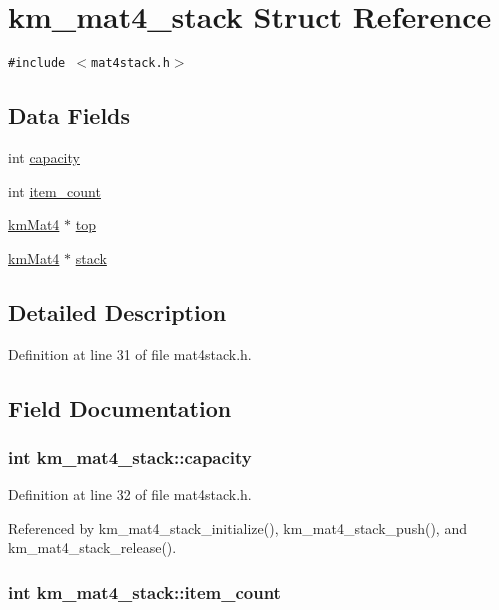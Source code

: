 \hypertarget{structkm__mat4__stack}{
\section{km\_\-mat4\_\-stack Struct Reference}
\label{structkm__mat4__stack}
}
{\tt \#include $<$mat4stack.h$>$}

\subsection*{Data Fields}
\begin{CompactItemize}
\item 
int \hyperlink{structkm__mat4__stack_069785a0a19481b635a91076f78547c7}{capacity}
\item 
int \hyperlink{structkm__mat4__stack_a29b07b2cae7bb1a8fbb699ec0ee3383}{item\_\-count}
\item 
\hyperlink{structkm_mat4}{kmMat4} $\ast$ \hyperlink{structkm__mat4__stack_487ba8aa0a0176eb21899bd8bc38f153}{top}
\item 
\hyperlink{structkm_mat4}{kmMat4} $\ast$ \hyperlink{structkm__mat4__stack_a8b2b968718d212c80d7923d9de6a0a8}{stack}
\end{CompactItemize}


\subsection{Detailed Description}


Definition at line 31 of file mat4stack.h.

\subsection{Field Documentation}
\hypertarget{structkm__mat4__stack_069785a0a19481b635a91076f78547c7}{
\subsubsection[capacity]{\setlength{\rightskip}{0pt plus 5cm}int {\bf km\_\-mat4\_\-stack::capacity}}}
\label{structkm__mat4__stack_069785a0a19481b635a91076f78547c7}




Definition at line 32 of file mat4stack.h.

Referenced by km\_\-mat4\_\-stack\_\-initialize(), km\_\-mat4\_\-stack\_\-push(), and km\_\-mat4\_\-stack\_\-release().\hypertarget{structkm__mat4__stack_a29b07b2cae7bb1a8fbb699ec0ee3383}{
\subsubsection[item\_\-count]{\setlength{\rightskip}{0pt plus 5cm}int {\bf km\_\-mat4\_\-stack::item\_\-count}}}
\label{structkm__mat4__stack_a29b07b2cae7bb1a8fbb699ec0ee3383}




